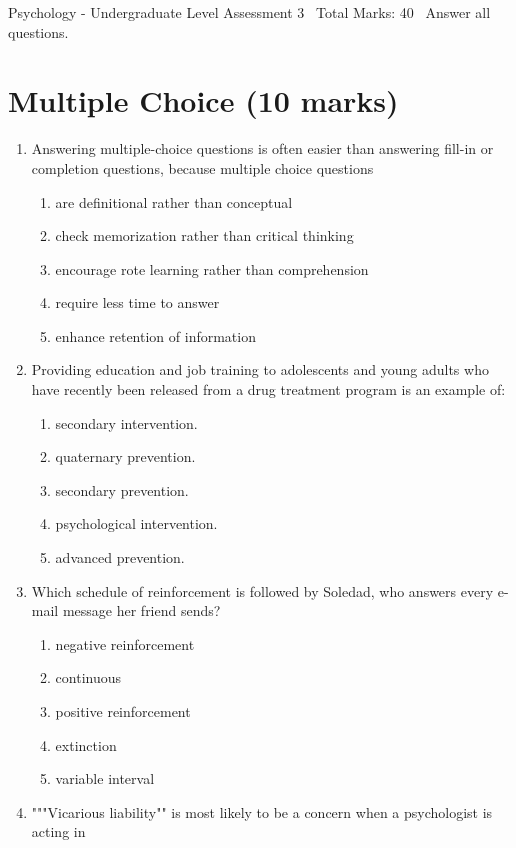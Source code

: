 \documentclass[12pt]{article}
\begin{document}
\begin{center}
Psychology - Undergraduate Level Assessment 3 \
Total Marks: 40 \
Answer all questions.
\end{center}

\section*{Multiple Choice (10 marks)}
\begin{enumerate}[label=\arabic*.]
\item Answering multiple-choice questions is often easier than answering fill-in or completion
questions, because multiple choice questions
\begin{enumerate}[label=(\alph*)]
    \item are definitional rather than conceptual
    \item check memorization rather than critical thinking
    \item encourage rote learning rather than comprehension
    \item require less time to answer
    \item enhance retention of information
\end{enumerate}
\item Providing education and job training to adolescents and young adults who have recently
been released from a drug treatment program is an example of:
\begin{enumerate}[label=(\alph*)]
    \item secondary intervention.
    \item quaternary prevention.
    \item secondary prevention.
    \item psychological intervention.
    \item advanced prevention.
\end{enumerate}
\item Which schedule of reinforcement is followed by Soledad, who answers every e-mail message
her friend sends?
\begin{enumerate}[label=(\alph*)]
    \item negative reinforcement
    \item continuous
    \item positive reinforcement
    \item extinction
    \item variable interval
\end{enumerate}
\item """Vicarious liability"" is most likely to be a concern when a psychologist is acting in

\end{enumerate}
\end{document}
